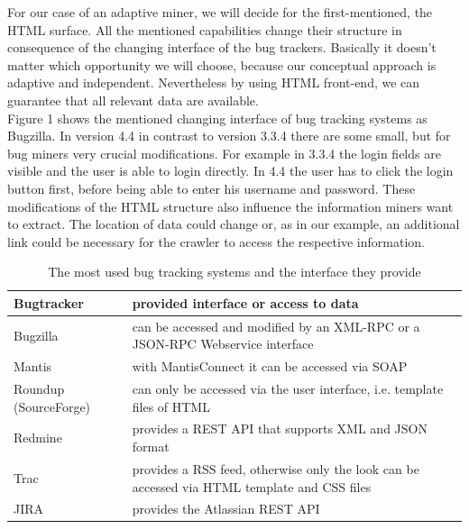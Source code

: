  For our case of an adaptive miner, we will decide for the first-mentioned, the HTML surface. All the mentioned capabilities change their  structure in consequence of the changing interface of the bug trackers.  Basically it doesn't matter which opportunity we will choose, because our conceptual approach is adaptive and independent. Nevertheless by using HTML front-end, we can guarantee that all relevant data are available.\\ Figure 1 shows the mentioned changing interface of bug tracking systems as Bugzilla. In version 4.4 in contrast to version 3.3.4 there are some small, but for bug miners very crucial modifications. For example in 3.3.4 the login fields are visible and the user is able to login directly. In 4.4 the user has to click the login button first, before being able to enter his username and password. These modifications of the HTML structure also influence the information miners want to extract. The location of data could change or, as in our example, an additional link could be necessary for the crawler to access the respective information.
\begin{table}
\centering
\begin{tabular}{|p{3cm}|p{10.5cm}|}
	\hline
	\textbf{Bugtracker} & \textbf{provided interface or access to data}  \\
	\hline
	\hline
	Bugzilla & can be accessed and modified by an XML-RPC or a JSON-RPC 	     Webservice interface \\
	\hline
	Mantis & with MantisConnect it can be accessed via SOAP \\
	\hline
	Roundup (SourceForge) & can only be accessed via the user interface, i.e. template files of HTML\\
	\hline
	Redmine & provides a REST API that supports XML and JSON format \\
	\hline
	Trac & provides a RSS feed, otherwise only the look can be accessed via HTML template and CSS files \\
	\hline
	JIRA & provides the Atlassian REST API \\
	\hline
\end{tabular}
\caption{The most used bug tracking systems and the interface they provide}
\label{tabelle interface}
\end{table} 

